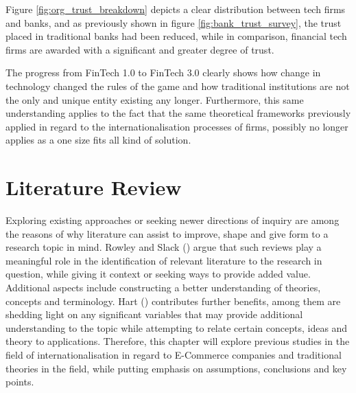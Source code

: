 \documentclass[11pt,a4paper]{article}
\begin{document}
Figure \ref{fig:org_trust_breakdown} depicts a clear distribution between tech firms and banks, and as previously shown in figure \ref{fig:bank_trust_survey}, the trust placed in traditional banks had been reduced, while in comparison, financial tech firms are awarded with a significant and greater degree of trust. \par
The progress from FinTech 1.0 to FinTech 3.0 clearly shows how change in technology changed the rules of the game and how traditional institutions are not the only and unique entity existing any longer. Furthermore, this same understanding applies to the fact that the same theoretical frameworks previously applied in regard to the internationalisation processes of firms, possibly no longer applies as a one size fits all kind of solution. 







\section{Literature Review}
\label{lit_review}
  \vspace{-5mm}
Exploring existing approaches or seeking newer directions of inquiry are among the reasons of why  literature can assist to improve, shape and give form to a research topic in mind. Rowley and Slack (\citeyear{rowleyConductingLiteratureReview2004}) argue that such reviews play a meaningful role in the identification of relevant literature to the research in question, while giving it context or seeking ways to provide added value. Additional aspects include constructing a better understanding of theories, concepts and terminology. Hart (\citeyear{hartDoingLiteratureReview1998}) contributes further benefits, among them are shedding light on any significant variables that may provide additional understanding to the topic while attempting to relate certain concepts, ideas and theory to applications. Therefore, this chapter will explore previous studies in the field of internationalisation in regard to E-Commerce companies and traditional theories  in the field, while putting emphasis on assumptions, conclusions and key points.
\end{document}
